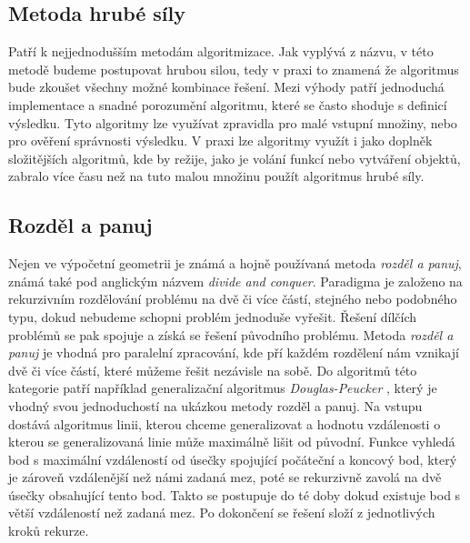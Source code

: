 \subsection{Metoda hrubé síly}
	Patří k nejjednodušším metodám algoritmizace. Jak vyplývá z názvu, v této metodě budeme postupovat hrubou silou, tedy v praxi to znamená že algoritmus bude zkoušet všechny možné kombinace řešení. Mezi výhody patří jednoduchá implementace a snadné porozumění algoritmu, které se často shoduje s definicí výsledku. Tyto algoritmy lze využívat zpravidla pro malé vstupní množiny, nebo pro ověření správnosti výsledku. V praxi lze algoritmy využít i jako doplněk složitějších algoritmů, kde by režije, jako je volání funkcí nebo vytváření objektů, zabralo více času než na tuto malou množinu použít algoritmus hrubé síly.
	
\subsection{Rozděl a panuj}
	Nejen ve výpočetní geometrii je známá a hojně používaná metoda \textit{rozděl a panuj}, známá také pod anglickým názvem \textit{divide and conquer}. Paradigma je založeno na rekurzivním rozdělování problému na dvě či více částí, stejného nebo podobného typu, dokud nebudeme schopni problém jednoduše vyřešit. Řešení dílčích problémů se pak spojuje a získá se řešení původního problému. Metoda \textit{rozděl a panuj} je vhodná pro paralelní zpracování, kde pří každém rozdělení nám vznikají dvě či více částí, které můžeme řešit nezávisle na sobě. \cite{frigo1999cache}
	Do algoritmů této kategorie patří například generalizační algoritmus \textit{Douglas-Peucker} \cite{van1997algorithmic}, který je vhodný svou jednoduchostí na ukázkou metody rozděl a panuj. 
	Na vstupu dostává algoritmus linii, kterou chceme generalizovat a hodnotu vzdálenosti o kterou se generalizovaná linie může maximálně lišit od původní. Funkce vyhledá bod s maximální vzdáleností od úsečky spojující počáteční a koncový bod, který je zároveň vzdálenější než námi zadaná mez, poté se rekurzivně zavolá na dvě úsečky obsahující tento bod. Takto se postupuje do té doby dokud existuje bod s větší vzdáleností než zadaná mez. Po dokončení se řešení složí z jednotlivých  kroků rekurze.

